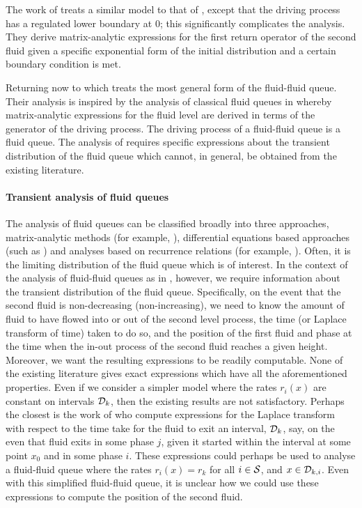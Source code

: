 The work of \cite{boz2022} treats a similar model to that of \cite{bo2013b}, except that the driving process has a regulated lower boundary at \(0\); this significantly complicates the analysis. They derive matrix-analytic expressions for the first return operator of the second fluid given a specific exponential form of the initial distribution and a certain boundary condition is met. %

Returning now to \cite{bo2014} which treats the most general form of the fluid-fluid queue. Their analysis is inspired by the analysis of classical fluid queues in \cite{bean2005} whereby matrix-analytic expressions for the fluid level are derived in terms of the generator of the driving process. The driving process of a fluid-fluid queue is a fluid queue. The analysis of \cite{bo2014} requires specific expressions about the transient distribution of the fluid queue which cannot, in general, be obtained from the existing literature.

\paragraph{Transient analysis of fluid queues} The analysis of fluid queues can be classified broadly into three approaches, matrix-analytic methods (for example, \cite{ajr2005,ar2003,ar2004,bean2005b,bean2005,bot08,bean2009,dasilva2005,latouche2018}), differential equations based approaches (such as \cite{anick1982,kk1995,blnos2022}) and analyses based on recurrence relations (for example, \cite{sericola1998,sericola1999,sericola2001}). Often, it is the limiting distribution of the fluid queue which is of interest. In the context of the analysis of fluid-fluid queues as in \cite{bo2014}, however, we require information about the transient distribution of the fluid queue. Specifically, on the event that the second fluid is non-decreasing (non-increasing), we need to know the amount of fluid to have flowed into or out of the second level process, the time (or Laplace transform of time) taken to do so, and the position of the first fluid and phase at the time when the in-out process of the second fluid reaches a given height. Moreover, we want the resulting expressions to be readily computable. None of the existing literature gives exact expressions which have all the aforementioned properties. Even if we consider a simpler model where the rates \(r_i(x)\) are constant on intervals \(\mathcal{D}_{k}\), then the existing results are not satisfactory. Perhaps the closest is the work of \cite{bean2009} who compute expressions for the Laplace transform with respect to the time take for the fluid to exit an interval, \(\mathcal{D}_{k}\), say, on the even that fluid exits in some phase \(j\), given it started within the interval at some point \(x_0\) and in some phase \(i\). These expressions could perhaps be used to analyse a fluid-fluid queue where the rates \(r_i(x)=r_k\) for all \(i\in\mathcal{S}\), and \(x\in\mathcal{D}_{k,i}\). Even with this simplified fluid-fluid queue, it is unclear how we could use these expressions to compute the position of the second fluid. 

